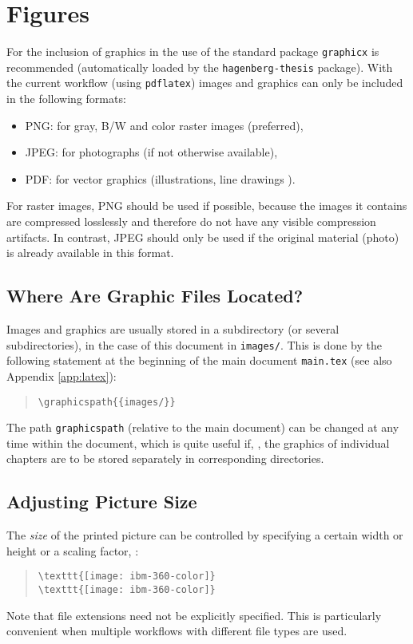 \section{Figures}

For the inclusion of graphics in \latex the use of the
standard package \texttt{graphicx} \cite{Carlisle2021} is recommended
(automatically loaded by the \texttt{hagenberg-thesis} package).
With the current workflow (using \texttt{pdflatex}) images and graphics
can only be included in the following formats:
%
\begin{itemize}
    \item PNG: for gray, B/W and color raster images (preferred),
    \item JPEG: for photographs (if not otherwise available),
    \item PDF: for vector graphics (illustrations, line drawings \etc).
\end{itemize}
%
For raster images, PNG should be used if possible, because the images it
contains are compressed losslessly and therefore do not have any visible
compression artifacts. In contrast, JPEG should only be used if the original
material (photo) is already available in this format.


\subsection{Where Are Graphic Files Located?}

Images and graphics are usually stored in a subdirectory (or several
subdirectories), in the case of this document in \nolinkurl{images/}. This is
done by the following statement at the beginning of the main document
\nolinkurl{main.tex} (see also Appendix \ref{app:latex}):
%
\begin{quote}
    \verb!\graphicspath{{images/}}!
\end{quote}
%
The path \texttt{graphicspath} (relative to the main document) can be changed
at any time within the document, which is quite useful if, \eg, the graphics
of individual chapters are to be stored separately in corresponding directories.


\subsection{Adjusting Picture Size}

The \emph{size} of the printed picture can be controlled by specifying a
certain width or height or a scaling factor, \eg:
%
\begin{quote}
    \verb!\texttt{[image: ibm-360-color]}! \\
    \verb!\texttt{[image: ibm-360-color]}!
\end{quote}
%
Note that file extensions need not be explicitly specified.
This is particularly convenient when multiple workflows with different file
types are used.


